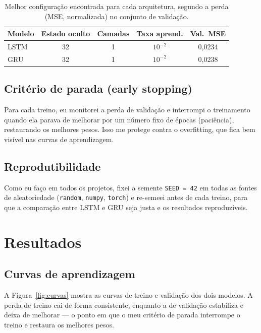 \documentclass[11pt,a4paper]{article}
\begin{document}
\begin{table}[H]
  \centering
  \caption{Melhor configuração encontrada para cada arquitetura, segundo a
  perda (MSE, normalizada) no conjunto de validação.}
  \label{tab:busca}
  \begin{tabular}{lcccc}
    \toprule
    Modelo & Estado oculto & Camadas & Taxa aprend. & Val.\ MSE \\
    \midrule
    LSTM & 32 & 1 & $10^{-2}$ & 0{,}0234 \\
    GRU  & 32 & 1 & $10^{-2}$ & 0{,}0238 \\
    \bottomrule
  \end{tabular}
\end{table}

\subsection{Critério de parada (early stopping)}

Para cada treino, eu monitorei a perda de validação e interrompi o treinamento
quando ela parava de melhorar por um número fixo de épocas (paciência),
restaurando os melhores pesos. Isso me protege contra o overfitting, que fica
bem visível nas curvas de aprendizagem.

\subsection{Reprodutibilidade}

Como eu faço em todos os projetos, fixei a semente \texttt{SEED = 42} em todas
as fontes de aleatoriedade (\texttt{random}, \texttt{numpy}, \texttt{torch}) e
re-semeei antes de cada treino, para que a comparação entre LSTM e GRU seja
justa e os resultados reproduzíveis.

\section{Resultados}

\subsection{Curvas de aprendizagem}

A Figura~\ref{fig:curvas} mostra as curvas de treino e validação dos dois
modelos. A perda de treino cai de forma consistente, enquanto a de validação
estabiliza e deixa de melhorar --- o ponto em que o meu critério de parada
interrompe o treino e restaura os melhores pesos.
\end{document}
